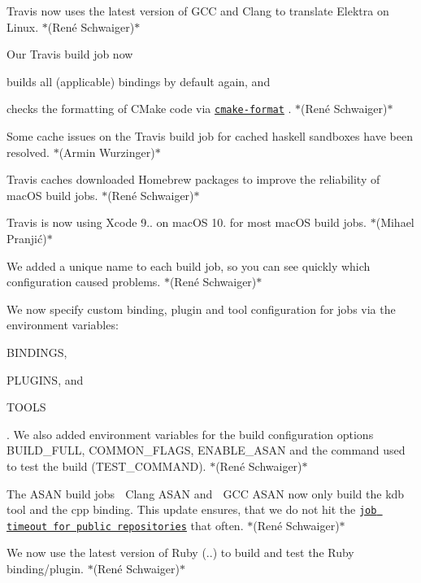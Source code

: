 \begin{DoxyItemize}
\item Travis now uses the latest version of G\+CC and Clang to translate Elektra on Linux. $\ast$(René Schwaiger)$\ast$
\item Our Travis build job now
\begin{DoxyItemize}
\item builds all (applicable) bindings by default again, and
\item checks the formatting of C\+Make code via \href{https://github.com/cheshirekow/cmake_format}{\tt {\ttfamily cmake-\/format}} . $\ast$(René Schwaiger)$\ast$
\end{DoxyItemize}
\item Some cache issues on the Travis build job for cached haskell sandboxes have been resolved. $\ast$(Armin Wurzinger)$\ast$
\item Travis caches downloaded Homebrew packages to improve the reliability of mac\+OS build jobs. $\ast$(René Schwaiger)$\ast$
\item Travis is now using Xcode 9.. on mac\+OS 10. for most mac\+OS build jobs. $\ast$(Mihael Pranjić)$\ast$
\item We added a unique name to each build job, so you can see quickly which configuration caused problems. $\ast$(René Schwaiger)$\ast$
\item We now specify custom binding, plugin and tool configuration for jobs via the environment variables\+:
\begin{DoxyItemize}
\item {\ttfamily B\+I\+N\+D\+I\+N\+GS},
\item {\ttfamily P\+L\+U\+G\+I\+NS}, and
\item {\ttfamily T\+O\+O\+LS}
\end{DoxyItemize}

. We also added environment variables for the build configuration options {\ttfamily B\+U\+I\+L\+D\+\_\+\+F\+U\+LL}, {\ttfamily C\+O\+M\+M\+O\+N\+\_\+\+F\+L\+A\+GS}, {\ttfamily E\+N\+A\+B\+L\+E\+\_\+\+A\+S\+AN} and the command used to test the build ({\ttfamily T\+E\+S\+T\+\_\+\+C\+O\+M\+M\+A\+ND}). $\ast$(René Schwaiger)$\ast$
\item The A\+S\+AN build jobs {\ttfamily 🍏 Clang A\+S\+AN} and {\ttfamily 🐧 G\+CC A\+S\+AN} now only build the {\ttfamily kdb} tool and the {\ttfamily cpp} binding. This update ensures, that we do not hit the \href{https://docs.travis-ci.com/user/customizing-the-build/#build-timeouts}{\tt job timeout for public repositories} that often. $\ast$(René Schwaiger)$\ast$
\item We now use the latest version of Ruby ({..}) to build and test the Ruby binding/plugin. $\ast$(René Schwaiger)$\ast$
\end{DoxyItemize}

